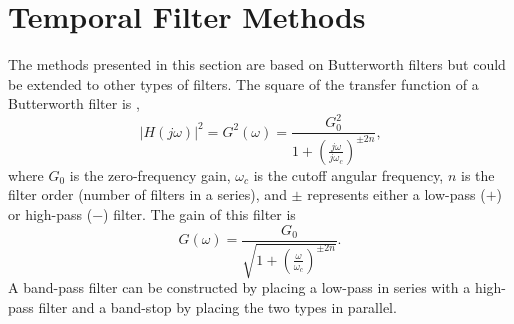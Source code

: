 \section{Temporal Filter Methods}
The methods presented in this section are based on Butterworth filters but could be extended to other types of filters.
The square of the transfer function of a Butterworth filter is \cite{Butterworth-1930-DvDrjKha},
\begin{equation}
 |H(j\omega)|^2 = G^2(\omega) = \frac{G_0^2}{1+\left(\frac{j\omega}{j\omega_c}\right)^{\pm2n}} \textrm{,}
 \label{eqn:06_butterworth}
\end{equation}
where $G_0$ is the zero-frequency gain, $\omega_c$ is the cutoff angular frequency, $n$ is the filter order (number of filters in a series), and $\pm$ represents either a low-pass ($+$) or high-pass ($-$) filter.
The gain of this filter is
\begin{equation}
  G(\omega) = \frac{G_0}{\sqrt{1+\left(\frac{\omega}{\omega_c}\right)^{\pm2n}}} \textrm{.}
  \label{eqn:06_butterworth_gain}
\end{equation}
A band-pass filter can be constructed by placing a low-pass in series with a high-pass filter and a band-stop by placing the two types in parallel.

